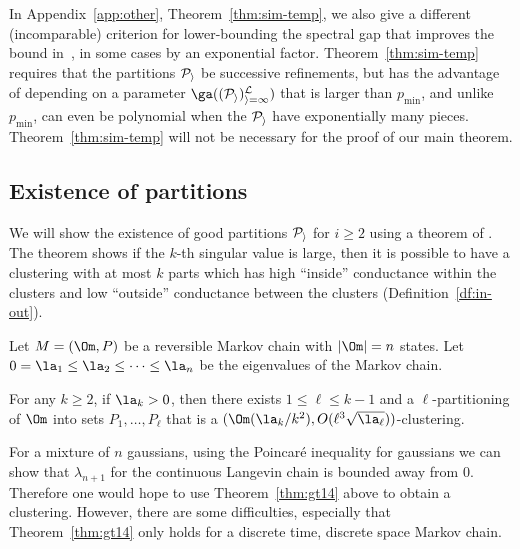 \begin{rem}
In Appendix~\ref{app:other}, Theorem~\ref{thm:sim-temp}, we also give a different (incomparable) criterion for lower-bounding the spectral gap that improves the bound in~\cite{woodard2009conditions}, in some cases by an exponential factor. Theorem~\ref{thm:sim-temp} requires that the partitions $\cal P_i$ be successive refinements, but has the advantage of depending on a parameter $\ga((\cal P_i)_{i=1}^L)$ that is larger than $p_{\min}$, and unlike $p_{\min}$, can even be polynomial when the $\cal P_i$ have exponentially many pieces. Theorem~\ref{thm:sim-temp} will not be necessary for the proof of our main theorem.
\end{rem}

\subsection{Existence of partitions} 
\label{sec:partition}

We will show the existence of good partitions $\cal P_i$ for $i\ge 2$ using a theorem of \cite{gharan2014partitioning}. The theorem shows if the $k$-th singular value is large, then it is possible to have a clustering with at most $k$ parts which has high ``inside'' conductance within the clusters and low ``outside'' conductance between the clusters (Definition~\ref{df:in-out}).

\begin{thm*}
Let $M=(\Om, P)$ be a reversible Markov chain with $|\Om|=n$ states. Let $0=\la_1\le \la_2\le \cdots\le \la_n$ be the eigenvalues of the Markov chain. %

For any $k\ge 2$, if $\la_k>0$, then there exists $1\le \ell\le k-1$ and a $\ell$-partitioning of $\Om$ into sets $P_1,\ldots, P_\ell$ that is a 
$
(\Om(\la_k/k^2), O(\ell^3\sqrt{\la_\ell}))
$-clustering.
\end{thm*}

For a mixture of $n$ gaussians, using  the Poincar\'e inequality for gaussians we can  show that $\lambda_{n+1}$ for the continuous Langevin chain is bounded away from 0. Therefore one would hope to use Theorem~\ref{thm:gt14} above to obtain a clustering. However, there are some difficulties, especially that Theorem~\ref{thm:gt14} only holds for a discrete time, discrete space Markov chain.

